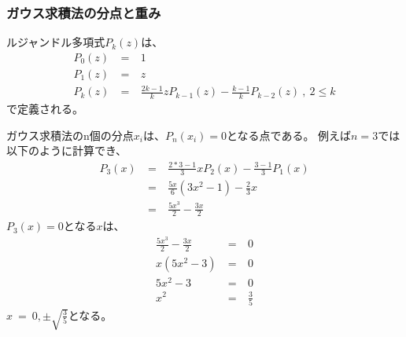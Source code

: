 \documentclass[dvipdfmx]{jsarticle}
\begin{document}
\subsubsection{ガウス求積法の分点と重み}
ルジャンドル多項式$P_k(z)$は、
\begin{eqnarray}
  P_0(z) ~&=&~ 1 \nonumber\\
  P_1(z) ~&=&~ z \nonumber\\
  P_k(z) ~&=&~ \frac{2k-1}{k}zP_{k-1}(z) - \frac{k-1}{k}P_{k-2}(z) ~,~2\leq k \nonumber
\end{eqnarray}
で定義される。

ガウス求積法のn個の分点$x_i$は、$P_n(x_i)=0$となる点である。
例えば$n=3$では以下のように計算でき、
\begin{eqnarray}
  P_3(x)~&=&~\frac{2*3-1}{3}xP_2(x) - \frac{3-1}{3}P_1(x) \nonumber\\
  &=&~\frac{5x}{6}(3x^2-1)-\frac{2}{3}x \nonumber\\
  &=&~\frac{5 x^{3}}{2} - \frac{3 x}{2} \nonumber
\end{eqnarray}
$P_3(x)=0$となる$x$は、
\begin{eqnarray}
  \frac{5 x^{3}}{2} - \frac{3 x}{2} ~&=&~ 0 \nonumber\\
  x(5x^2-3) ~&=&~ 0 \nonumber\\
  5x^2-3 ~&=&~ 0 \nonumber\\
  x^2 ~&=&~ \frac{3}{5} \nonumber
\end{eqnarray}
$x~=~0,\pm{\sqrt{\frac{3}{5}}}$となる。
\end{document}
